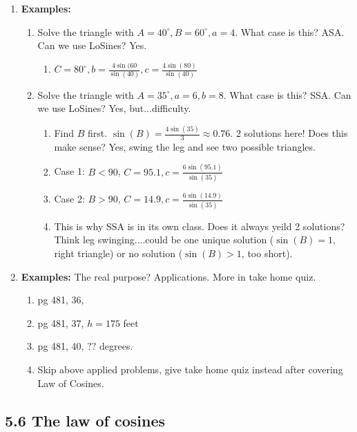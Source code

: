 \documentclass{article}
\begin{document}
\begin{enumerate}
\item {\bf Examples:}
\begin{enumerate}
\item Solve the triangle with $A=40^\circ, B=60^\circ, a=4$. What case is this? ASA. Can we use LoSines? Yes.
\begin{enumerate}
\item $C = 80^{\circ}, b = \frac{4\sin(60}{\sin(40)}, c = \frac{4\sin(80)}{\sin(40)}$
\end{enumerate}
\item Solve the triangle with $A=35^\circ, a=6, b=8$. What case is this? SSA. Can we use LoSines? Yes, but...difficulty.
\begin{enumerate}
\item Find $B$ first. $\sin(B) = \frac{4\sin(35)}{3}\approx 0.76$. 2 solutions here! Does this make sense? Yes, swing the leg and see two possible triangles.
\item Case 1: $B<90$, $C=95.1, c = \frac{6\sin(95.1)}{\sin(35)}$
\item Case 2: $B>90$, $C=14.9, c = \frac{6\sin(14.9)}{\sin(35)}$
\item This is why SSA is in its own class. Does it always yeild 2 solutions? Think leg swinging....could be one unique solution ($\sin(B)=1$, right triangle) or no solution ($\sin(B)>1$, too short). 
\end{enumerate}
\end{enumerate}

\item {\bf Examples:} The real purpose? Applications. More in take home quiz.
\begin{enumerate}
\item pg 481, 36,
\item pg 481, 37, \quad $h=175$ feet
\item pg 481, 40, \quad $??$ degrees.

\item Skip above applied problems, give take home quiz instead after covering Law of Cosines.

\end{enumerate}
\end{enumerate}



\subsection{5.6 The law of cosines}
\end{document}
